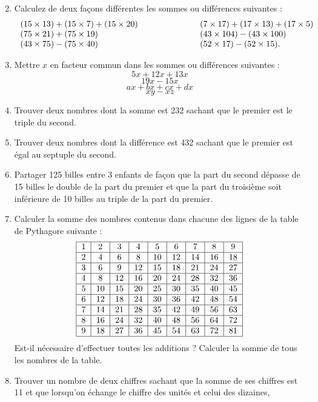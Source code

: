 \begin{enumerate}
\[\]
\item Calculez de deux façons différentes les sommes ou différences suivantes : 
 \[
\begin{tabular}{lll}
$(15 \times 13) + (15 \times 7) + (15 \times 20)$ &\phantom{meowmeow}& $ (7 \times 17) + (17 \times 13) + (17 \times 5) $ \\
$(75 \times 21) + (75 \times 19)$ &\phantom{meowmeow}& 
$(43 \times 104) - (43 \times 100)$\\
$(43 \times 75) - (75 \times 40)$ &\phantom{meowmeow}& $(52 \times 17) - (52 \times 15)$.
\end{tabular}
\]
\item Mettre $x$ en facteur commun dans les sommes ou différences suivantes : 
\[ 5x + 12x + 13x\]
\[19x - 15x\]
\[ax + bx + cx + dx\]
\[xy - xz\]
\item Trouver deux nombres dont la somme est 232 sachant que le premier est le triple du second.
\item Trouver deux nombres dont la différence est 432
sachant que le premier est égal au septuple du second.
\item Partager 125 billes entre 3 enfants de façon que la part du second dépasse de 15 billes le double de 
la part du premier et que la part du troisième soit inférieure de 10 billes au triple de la part du premier. 
\item Calculer la somme des nombres contenus dans chacune des lignes de la table de Pythagore suivante : 
\[\begin{tabular}{| c | c | c | c | c | c | c | c | c |}
\hline
1 & 2 & 3 & 4 & 5 & 6 & 7 & 8 & 9 \\ \hline
2 & 4 & 6 & 8 & 10 & 12 & 14 & 16 & 18 \\ \hline
3 & 6 & 9 & 12 & 15 & 18 & 21 & 24 & 27 \\ \hline
4 & 8 & 12 & 16 & 20 & 24 & 28 & 32 & 36 \\ \hline
5 & 10 & 15 & 20 & 25 & 30 & 35 & 40 & 45 \\ \hline
6 & 12 & 18 & 24 & 30 & 36 & 42 & 48 & 54 \\ \hline
7 & 14 & 21  & 28 & 35 & 42 & 49 & 56 & 63 \\ \hline
8 & 16 & 24 & 32 & 40 & 48 & 56 & 64 & 72 \\ \hline
9 & 18 & 27 & 36 & 45 & 54 & 63 & 72 & 81 \\ \hline \end{tabular}\]
Est-il nécessaire d'effectuer toutes les additions ? 
Calculer la somme de tous les nombres de la table. 
\item Trouver un nombre de deux chiffres sachant que la somme de ses chiffres est 11 et que lorsqu'on échange le chiffre des unités et celui des dizaines,

\end{enumerate}
